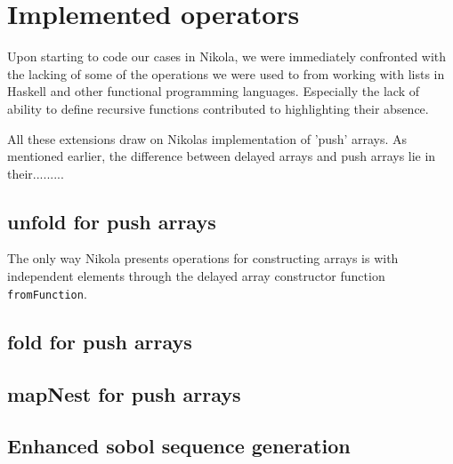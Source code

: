 \section{Implemented operators}

Upon starting to code our cases in Nikola, we were immediately confronted with
the lacking of some of the operations we were used to from working with lists
in Haskell and other functional programming languages.  Especially the lack of
ability to define recursive functions contributed to highlighting their
absence.

All these extensions draw on Nikolas implementation of 'push' arrays. As mentioned earlier, the difference between delayed arrays and push arrays lie in their.........

\subsection{unfold for push arrays}

The only way Nikola presents operations for constructing arrays is with
independent elements through the delayed array constructor function
\texttt{fromFunction}.



\subsection{fold for push arrays}
\subsection{mapNest for push arrays}
\subsection{Enhanced sobol sequence generation}
